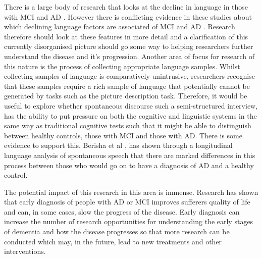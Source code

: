 \documentclass[12pt]{article}
\begin{document}
There is a large body of research that looks at the decline in language in those with MCI and AD \cite{Taler2008, Boschi2017}. However there is conflicting evidence in these studies about which declining language factors are associated of MCI and AD \cite{Taler2008, Boschi2017}. Research therefore should look at these features in more detail and a clarification of this currently disorganised picture should go some way to helping researchers further understand the disease and it's progression. Another area of focus for research of this nature is the process of collecting appropriate language samples. Whilst collecting samples of language is comparatively unintrusive, researchers recognise that these samples require a rich sample of language that potentially cannot be generated by tasks such as the picture description task. Therefore, it would be useful to explore whether spontaneous discourse such a semi-structured interview, has the ability to put pressure on both the cognitive and linguistic systems in the same way as traditional cognitive tests such that it might be able to distinguish between healthy controls, those with MCI and those with AD. There is some evidence to support this. Berisha et al \cite{Berisha2015}, has shown through a longitudinal language analysis of spontaneous speech that there are marked differences in this process between those who would go on to have a diagnosis of AD and a healthy control. 
\par
The potential impact of this research in this area is immense. Research has shown that early diagnosis of people with AD or MCI improves sufferers quality of life and can, in some cases, slow the progress of the disease. Early diagnosis can increase the number of research opportunities for understanding the early stages of dementia and how the disease progresses so that more research can be conducted which may, in the future, lead to new treatments and other interventions.
\end{document}
